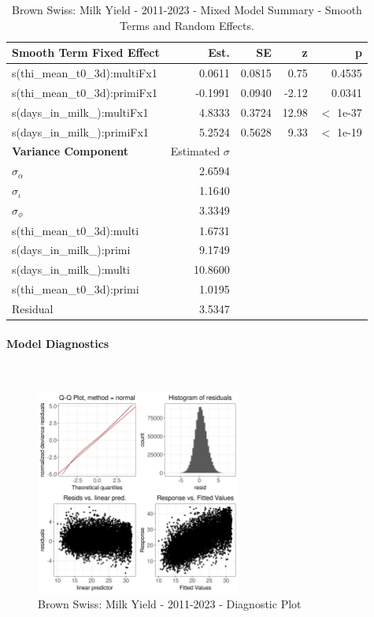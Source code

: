 \newpage
\begin{table}[H]
\centering
\begin{tabular}
{l | r | r | r | r}
\textbf{Smooth Term Fixed Effect} & Est. & SE & z & p\\
\hline
\hline
s(thi\_mean\_t0\_3d):multiFx1 & 0.0611 & 0.0815 & 0.75 & 0.4535\\
s(thi\_mean\_t0\_3d):primiFx1 & -0.1991 & 0.0940 & -2.12 & 0.0341\\
s(days\_in\_milk\_):multiFx1 & 4.8333 & 0.3724 & 12.98 & $<$ 1e-37\\
s(days\_in\_milk\_):primiFx1 & 5.2524 & 0.5628 & 9.33 & $<$ 1e-19\\
\hline
\textbf{Variance Component} & Estimated $\sigma$ & & & \\
\hline
\hline
$\sigma_\alpha$ & 2.6594 & & & \\
$\sigma_\iota$ & 1.1640 & & & \\
$\sigma_\phi$ & 3.3349 & & & \\
s(thi\_mean\_t0\_3d):multi & 1.6731 & & & \\
s(days\_in\_milk\_):primi & 9.1749 & & & \\
s(days\_in\_milk\_):multi & 10.8600 & & & \\
s(thi\_mean\_t0\_3d):primi & 1.0195 & & & \\
Residual & 3.5347 & & & \\
\end{tabular}
\caption[]{Brown Swiss: Milk Yield - 2011-2023 - Mixed Model Summary - Smooth Terms and Random Effects.}
\end{table}

\paragraph{Model Diagnostics} \quad \\
\begin{figure}[H]
    \centering
    \includegraphics[width=0.6\textwidth]{thesis/figures/models/milk/after2010/bs_milk_after2010/bs_milk_after2010_diagnostics.png}
    \caption[]{Brown Swiss: Milk Yield - 2011-2023 - Diagnostic Plot}
\end{figure}

